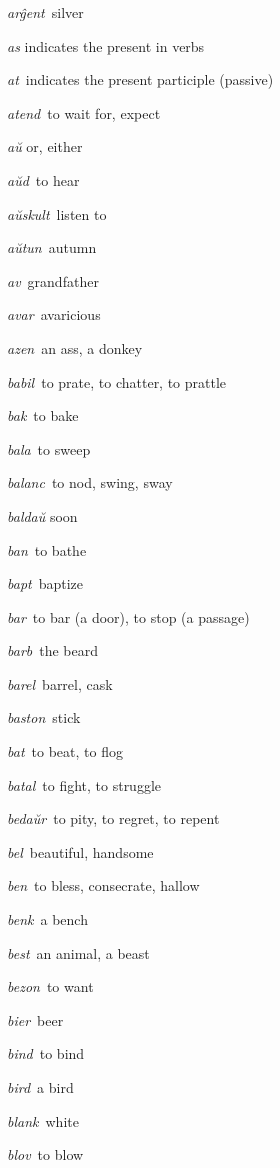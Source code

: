 \begin{landscape}
\begin{multicols}{5}
\begin{outdent}{1em}
\emph{arĝent\,} silver

\emph{as} indicates the present in verbs

\emph{at\,} indicates the present participle (passive)

\emph{atend\,} to wait for, expect

\emph{aŭ} or, either

\emph{aŭd\,} to hear

\emph{aŭskult\,} listen to

\emph{aŭtun\,} autumn

\emph{av\,} grandfather

\emph{avar\,} avaricious

\emph{azen\,} an ass, a donkey
\end{outdent}


\begin{outdent}{1em}
\emph{babil\,} to prate, to chatter, to prattle

\emph{bak\,} to bake

\emph{bala\,} to sweep

\emph{balanc\,} to nod, swing, sway

\emph{baldaŭ} soon

\emph{ban\,} to bathe

\emph{bapt\,} baptize

\emph{bar\,} to bar (a door), to stop (a passage)

\emph{barb\,} the beard

\emph{barel\,} barrel, cask

\emph{baston\,} stick

\emph{bat\,} to beat, to flog

\emph{batal\,} to fight, to struggle

\emph{bedaŭr\,} to pity, to regret, to repent

\emph{bel\,} beautiful, handsome

\emph{ben\,} to bless, consecrate, hallow

\emph{benk\,} a bench

\emph{best\,} an animal, a beast

\emph{bezon\,} to want

\emph{bier\,} beer

\emph{bind\,} to bind

\emph{bird\,} a bird

\emph{blank\,} white

\emph{blov\,} to blow


\end{outdent}
\end{multicols}
\end{landscape}
